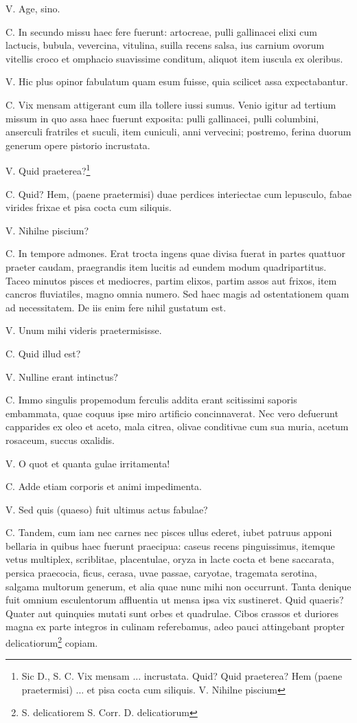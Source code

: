 \documentclass{article}
\begin{document}
V. Age, sino.

C. In secundo missu haec fere fuerunt: artocreae, pulli gallinacei elixi cum lactucis, bubula, vevercina, vitulina, suilla recens salsa, ius carnium ovorum vitellis croco et omphacio suavissime conditum, aliquot item iuscula ex oleribus.

V. Hic plus opinor fabulatum quam esum fuisse, quia scilicet assa expectabantur.

C. Vix mensam attigerant cum illa tollere iussi sumus. Venio igitur ad tertium missum in quo assa haec fuerunt exposita: pulli gallinacei, pulli columbini, anserculi fratriles et suculi, item cuniculi, anni vervecini; postremo, ferina duorum generum opere pistorio incrustata.

V. Quid praeterea?\footnote{Sic D., S. C. Vix mensam ... incrustata. Quid? Quid praeterea? Hem (paene praetermisi) ... et pisa cocta cum siliquis. V. Nihilne piscium}

C. Quid? Hem, (paene praetermisi) duae perdices interiectae cum lepusculo, fabae virides frixae et pisa cocta cum siliquis.

V. Nihilne piscium?

C. In tempore admones. Erat trocta ingens quae divisa fuerat in partes quattuor praeter caudam, praegrandis item lucitis ad eundem modum quadripartitus. Taceo minutos pisces et mediocres, partim elixos, partim assos aut frixos, item cancros fluviatiles, magno omnia numero. Sed haec magis ad ostentationem quam ad necessitatem. De iis enim fere nihil gustatum est.

V. Unum mihi videris praetermisisse.

C. Quid illud est?

V. Nulline erant intinctus?

C. Immo singulis propemodum ferculis addita erant scitissimi saporis embammata, quae coquus ipse miro artificio concinnaverat. Nec vero defuerunt capparides ex oleo et aceto, mala citrea, olivae conditivae cum sua muria, acetum rosaceum, succus oxalidis.

V. O quot et quanta gulae irritamenta!

C. Adde etiam corporis et animi impedimenta.

V. Sed quis (quaeso) fuit ultimus actus fabulae?

C. Tandem, cum iam nec carnes nec pisces ullus ederet, iubet patruus apponi bellaria in quibus haec fuerunt praecipua: caseus recens pinguissimus, itemque vetus multiplex, scriblitae, placentulae, oryza in lacte cocta et bene saccarata, persica praecocia, ficus, cerasa, uvae passae, caryotae, tragemata serotina, salgama multorum generum, et alia quae nunc mihi non occurrunt. Tanta denique fuit omnium esculentorum affluentia ut mensa ipsa vix sustineret. Quid quaeris? Quater aut quinquies mutati sunt orbes et quadrulae. Cibos crassos et duriores magna ex parte integros in culinam referebamus, adeo pauci attingebant propter delicatiorum\footnote{S. delicatiorem S. Corr. D. delicatiorum} copiam.
\end{document}
